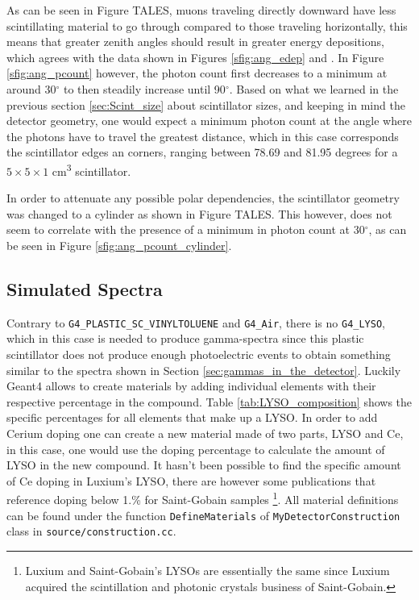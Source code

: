 As can be seen in Figure TALES, muons traveling directly downward have less scintillating material to go through compared to those traveling horizontally, this means that greater zenith angles should result in greater energy depositions, which agrees with the data shown in Figures \ref{sfig:ang_edep} and . In Figure \ref{sfig:ang_pcount} however, the photon count first decreases to a minimum at around 30$^\circ$ to then steadily increase until 90$^\circ$. Based on what we learned in the previous section \ref{sec:Scint_size} about scintillator sizes, and keeping in mind the detector geometry, one would expect a minimum photon count at the angle where the photons have to travel the greatest distance, which in this case corresponds the scintillator edges an corners, ranging between 78.69 and 81.95 degrees for a $5\times5\times1$ \unit{\cm\cubed} scintillator.

In order to attenuate any possible polar dependencies, the scintillator geometry was changed to a cylinder as shown in Figure TALES. This however, does not seem to correlate with the presence of a minimum in photon count at 30$^\circ$, as can be seen in Figure \ref{sfig:ang_pcount_cylinder}.

\subsection{Simulated Spectra}

Contrary to \texttt{G4\_PLASTIC\_SC\_VINYLTOLUENE} and \texttt{G4\_Air}, there is no \texttt{G4\_LYSO}, which in this case is needed to produce gamma-spectra since this plastic scintillator does not produce enough photoelectric events to obtain something similar to the spectra shown in Section \ref{sec:gammas_in_the_detector}. Luckily Geant4 allows to create materials by adding individual elements with their respective percentage in the compound. Table \ref{tab:LYSO_composition} shows the specific percentages for all elements that make up a LYSO. In order to add Cerium doping one can create a new material made of two parts, LYSO and Ce, in this case, one would use the doping percentage to calculate the amount of LYSO in the new compound. It hasn't been possible to find the specific amount of Ce doping in Luxium's LYSO, there are however some publications that reference doping below 1.\% for Saint-Gobain samples \cite{Ce_doping,Ce_dopping_2}\footnote{Luxium and Saint-Gobain's LYSOs are essentially the same since Luxium acquired the scintillation and photonic crystals business of Saint-Gobain.}. All material definitions can be found under the function \texttt{DefineMaterials} of \texttt{MyDetectorConstruction} class in \texttt{source/construction.cc}.

